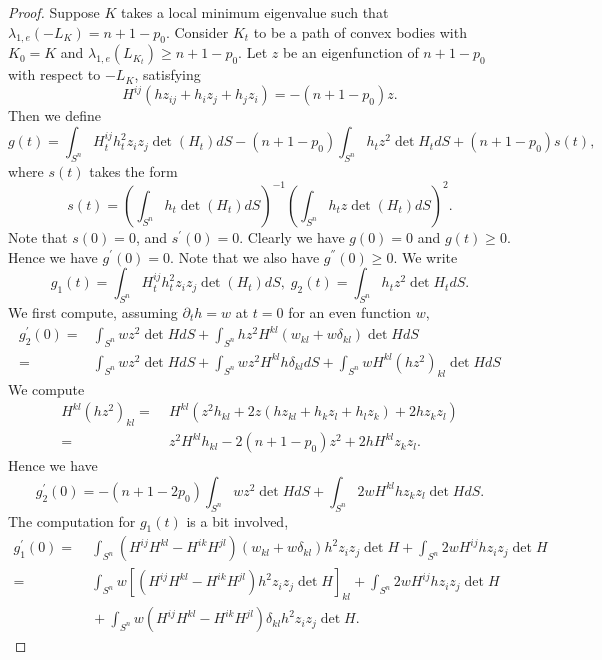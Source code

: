 \documentclass[reqno]{amsart}
\theoremstyle{remark}
\def\p{\partial}
\theoremstyle{plain}
\begin{document}
\begin{proof}
Suppose $K$ takes a local minimum eigenvalue such that  $\lambda_{1, e}(-L_K)=n+1-p_0$. Consider $K_t$ to be a path of convex bodies with $K_0=K$ and $\lambda_{1, e}(L_{K_t})\geq n+1-p_0$. 
Let $z$ be an eigenfunction of $n+1-p_0$ with respect to $-L_{K}$, satisfying
\begin{equation}
    H^{ij}(hz_{ij}+h_iz_j+h_jz_i)=-(n+1-p_0)z.
\end{equation}
Then we define
\begin{equation}
g(t)=\int_{S^n} H^{ij}_t h^2_tz_iz_j \det(H_t) dS-(n+1-p_0) \int_{S^n} h_t z^2 \det{H_t} dS+(n+1-p_0)s(t),
\end{equation}
where $s(t)$ takes the form
\[
s(t)=\left(\int_{S^n}h_t \det(H_t)dS\right)^{-1} \left(\int_{S^n} h_t z \det(H_t) dS\right)^2.
\]
Note that $s(0)=0$, and $s^{'}(0)=0$.
Clearly we have $g(0)=0$ and $g(t)\geq 0$. Hence we have $g^{'}(0)=0$.
Note that we also have $g^{''}(0)\geq 0$. 
We write 
\[
g_1(t)=\int_{S^n} H^{ij}_t h^2_tz_iz_j \det(H_t) dS,\; g_2(t)=\int_{S^n} h_t z^2 \det{H_t} dS.
\]
We first compute, assuming $\p_t h=w$ at $t=0$ for an even function  $w$,
\begin{equation}
\begin{split}
     g_2^{'}(0)=&\int_{S^n} wz^2 \det{H} dS+\int_{S^n} hz^2 H^{kl}(w_{kl}+w\delta_{kl})\det{H} dS\\
     =&\int_{S^n} wz^2\det{H}dS+\int_{S^n} wz^2 H^{kl} h\delta_{kl}dS+\int_{S^n} wH^{kl}(hz^2)_{kl}\det{H}dS
\end{split}
\end{equation}
We compute
\[
\begin{split}
H^{kl}(hz^2)_{kl}=&\;H^{kl}(z^2 h_{kl}+2z(hz_{kl}+h_{k}z_l+h_lz_k)+2hz_kz_l)\\
=&\;z^2 H^{kl} h_{kl}-2(n+1-p_0)z^2+2hH^{kl}z_kz_l.
\end{split}
\]
Hence we have
\begin{equation}
    g^{'}_2(0)=-(n+1-2p_0)\int_{S^n} wz^2\det{H}dS+\int_{S^n} 2w H^{kl}hz_kz_l \det{H} dS.
\end{equation}
The computation for $g_1(t)$ is a bit involved,
\begin{equation}
\begin{split}
    g_1^{'}(0)=&\;\int_{S^n}(H^{ij}H^{kl}-H^{ik}H^{jl})(w_{kl}+w\delta_{kl})h^2z_iz_j\det{H}+\int_{S^n}2w H^{ij}hz_iz_j\det{H}\\
    =&\;\int_{S^n} w \left[(H^{ij}H^{kl}-H^{ik}H^{jl})h^2 z_iz_j\det{H}\right]_{kl}+\int_{S^n}2w H^{ij}hz_iz_j\det{H}\\&\;+\int_{S^n} w (H^{ij}H^{kl}-H^{ik}H^{jl})\delta_{kl}h^2z_iz_j\det{H}.

\end{split}
\end{equation}
\end{proof}
\end{document}
